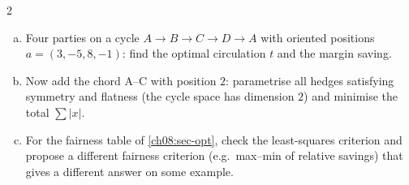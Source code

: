 \begin{paracol}{2}
\begin{exercise}
\leavevmode
\begin{enumerate}[(a)]
  \item Four parties on a cycle $A\to B\to C\to D\to A$ with oriented positions $a=(3,-5,8,-1)$: find the optimal
      circulation $t$ and the margin saving.
  \item Now add the chord A--C with position $2$: parametrise all hedges satisfying
      symmetry and flatness (the cycle space has dimension $2$) and minimise the total $\sum|x|$.
  \item For the fairness table
      of \cref{ch08:sec-opt}, check the least-squares criterion and propose a different fairness criterion (e.g.\ max--min
      of relative savings) that gives a different answer on some example.
\end{enumerate}
\end{exercise}


\end{paracol}
